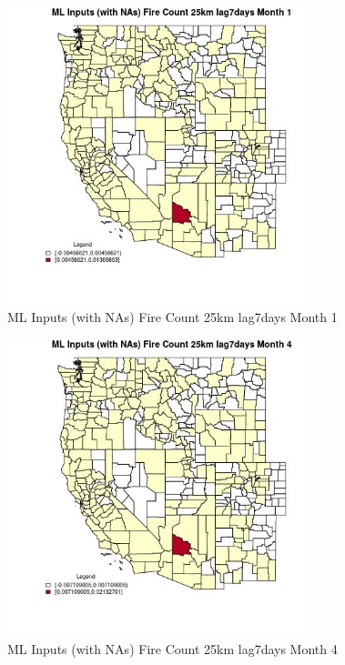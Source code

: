 \begin{figure} 
\centering  
\includegraphics[width=0.77\textwidth]{Code_Outputs/Report_ML_input_PM25_Step4_part_e_de_duplicated_aves_compiled_2019-05-21wNAs_CountyFire_Count_25km_lag7daysmedianMonth1.jpg} 
\caption{\label{fig:Report_ML_input_PM25_Step4_part_e_de_duplicated_aves_compiled_2019-05-21wNAsCountyFire_Count_25km_lag7daysmedianMonth1}ML Inputs (with NAs) Fire Count 25km lag7days Month 1} 
\end{figure} 
 

\begin{figure} 
\centering  
\includegraphics[width=0.77\textwidth]{Code_Outputs/Report_ML_input_PM25_Step4_part_e_de_duplicated_aves_compiled_2019-05-21wNAs_CountyFire_Count_25km_lag7daysmedianMonth4.jpg} 
\caption{\label{fig:Report_ML_input_PM25_Step4_part_e_de_duplicated_aves_compiled_2019-05-21wNAsCountyFire_Count_25km_lag7daysmedianMonth4}ML Inputs (with NAs) Fire Count 25km lag7days Month 4} 
\end{figure} 
 

